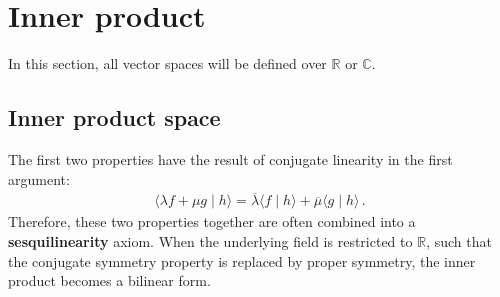 \section{Inner product}\label{section:innerproduct}

    In this section, all vector spaces will be defined over $\mathbb{R}$ or $\mathbb{C}$.

\subsection{Inner product space}

    \begin{result}
        The first two properties have the result of conjugate linearity in the first argument:
        \begin{gather}
            \langle \lambda f + \mu g\mid h \rangle = \overline{\lambda}\langle f\mid h \rangle + \overline{\mu}\langle g\mid h \rangle\,.
        \end{gather}
        Therefore, these two properties together are often combined into a \textbf{sesquilinearity} axiom. When the underlying field is restricted to $\mathbb{R}$, such that the conjugate symmetry property is replaced by proper symmetry, the inner product becomes a bilinear form.
    \end{result}


